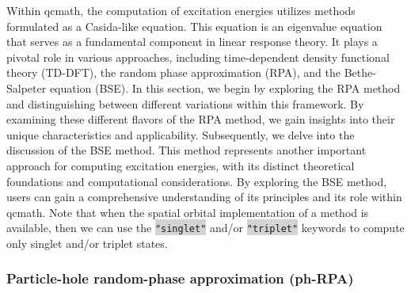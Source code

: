 \documentclass[aip,jcp,reprint,noshowkeys,superscriptaddress]{revtex4-1}
\newcommand{\keyword}[1]{{\colorbox{lightgray}{\texttt{#1}}}}
\begin{document}
Within qcmath, the computation of excitation energies utilizes methods formulated as a Casida-like equation.\cite{Casida_2005} This equation is an eigenvalue equation that serves as a fundamental component in linear response theory. It plays a pivotal role in various approaches, including time-dependent density functional theory (TD-DFT), the random phase approximation (RPA), and the Bethe-Salpeter equation (BSE).
In this section, we begin by exploring the RPA method and distinguishing between different variations within this framework. By examining these different flavors of the RPA method, we gain insights into their unique characteristics and applicability.
Subsequently, we delve into the discussion of the BSE method. This method represents another important approach for computing excitation energies, with its distinct theoretical foundations and computational considerations. By exploring the BSE method, users can gain a comprehensive understanding of its principles and its role within qcmath. Note that when the spatial orbital implementation of a method is available, then we can use the \keyword{"singlet"} and/or \keyword{"triplet"} keywords to compute only singlet and/or triplet states.

\subsubsection*{Particle-hole random-phase approximation (ph-RPA)}
\label{subsec:ph-RPA}
\end{document}
